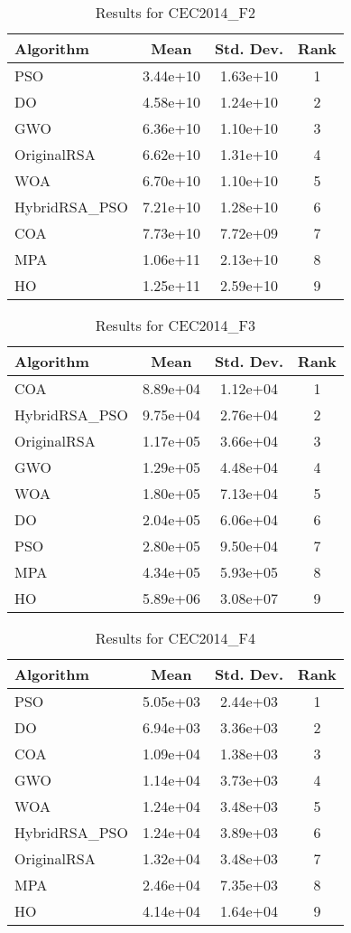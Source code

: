\documentclass[12pt]{article}
\begin{document}
\begin{table}[H]
\centering
\caption{Results for CEC2014\_F2}
\begin{tabular}{|l|c|c|c|}
\hline
\textbf{Algorithm} & \textbf{Mean} & \textbf{Std. Dev.} & \textbf{Rank} \\
\hline
PSO & 3.44e+10 & 1.63e+10 & 1 \\
DO & 4.58e+10 & 1.24e+10 & 2 \\
GWO & 6.36e+10 & 1.10e+10 & 3 \\
OriginalRSA & 6.62e+10 & 1.31e+10 & 4 \\
WOA & 6.70e+10 & 1.10e+10 & 5 \\
HybridRSA\_PSO & 7.21e+10 & 1.28e+10 & 6 \\
COA & 7.73e+10 & 7.72e+09 & 7 \\
MPA & 1.06e+11 & 2.13e+10 & 8 \\
HO & 1.25e+11 & 2.59e+10 & 9 \\
\hline
\end{tabular}
\end{table}

\begin{table}[H]
\centering
\caption{Results for CEC2014\_F3}
\begin{tabular}{|l|c|c|c|}
\hline
\textbf{Algorithm} & \textbf{Mean} & \textbf{Std. Dev.} & \textbf{Rank} \\
\hline
COA & 8.89e+04 & 1.12e+04 & 1 \\
HybridRSA\_PSO & 9.75e+04 & 2.76e+04 & 2 \\
OriginalRSA & 1.17e+05 & 3.66e+04 & 3 \\
GWO & 1.29e+05 & 4.48e+04 & 4 \\
WOA & 1.80e+05 & 7.13e+04 & 5 \\
DO & 2.04e+05 & 6.06e+04 & 6 \\
PSO & 2.80e+05 & 9.50e+04 & 7 \\
MPA & 4.34e+05 & 5.93e+05 & 8 \\
HO & 5.89e+06 & 3.08e+07 & 9 \\
\hline
\end{tabular}
\end{table}

\begin{table}[H]
\centering
\caption{Results for CEC2014\_F4}
\begin{tabular}{|l|c|c|c|}
\hline
\textbf{Algorithm} & \textbf{Mean} & \textbf{Std. Dev.} & \textbf{Rank} \\
\hline
PSO & 5.05e+03 & 2.44e+03 & 1 \\
DO & 6.94e+03 & 3.36e+03 & 2 \\
COA & 1.09e+04 & 1.38e+03 & 3 \\
GWO & 1.14e+04 & 3.73e+03 & 4 \\
WOA & 1.24e+04 & 3.48e+03 & 5 \\
HybridRSA\_PSO & 1.24e+04 & 3.89e+03 & 6 \\
OriginalRSA & 1.32e+04 & 3.48e+03 & 7 \\
MPA & 2.46e+04 & 7.35e+03 & 8 \\
HO & 4.14e+04 & 1.64e+04 & 9 \\
\hline
\end{tabular}
\end{table}
\end{document}
